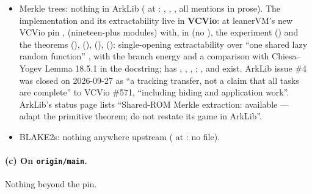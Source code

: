 \begin{itemize}
  (, ). 
  () has  for its body (lib-arklib
  B.2).
\item Merkle trees: nothing in ArkLib ( at :
  , , , all
  mentions in prose). The implementation and its extractability live in \textbf{VCVio}: at
  leanerVM's new VCVio pin , 
  (nineteen-plus modules) with, in  (no ), the experiment
   () and the theorems 
  (),  (),  (),
   (): single-opening extractability over ``one shared lazy random
  function'' , with the branch energy
   and a comparison with Chiesa--Yogev
  Lemma 18.5.1 in the docstring;  has , ,
  , ;
  , 
  and  exist. ArkLib issue \#4 was closed on 2026-09-27 as ``a tracking
  transfer, not a claim that all tasks are complete'' to VCVio \#571, ``including hiding and
  application work''. ArkLib's status page lists ``Shared-ROM Merkle extraction: available ---
  adapt the primitive theorem; do not restate its game in ArkLib''.
\item BLAKE2s: nothing anywhere upstream ( at : no
  file).
\end{itemize}

\paragraph{(c) On \texttt{origin/main}.}
Nothing beyond the pin.

